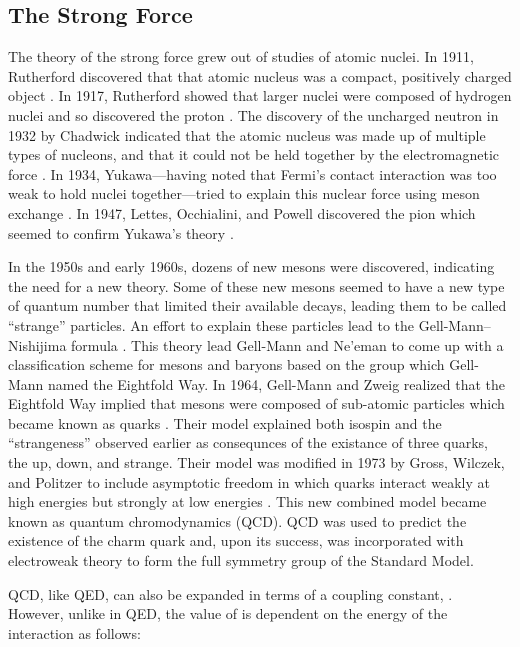 \subsection{The Strong Force}
\label{ssec:strong_force}

The theory of the strong force grew out of studies of atomic nuclei. In 1911,
Rutherford discovered that that atomic nucleus was a compact, positively
charged object \cite{rutherford1911}. In 1917, Rutherford showed that larger
nuclei were composed of hydrogen nuclei and so discovered the proton
\cite{rutherford1919}. The discovery of the uncharged neutron in 1932 by
Chadwick indicated that the atomic nucleus was made up of multiple types of
nucleons, and that it could not be held together by the electromagnetic force
\cite{chadwick1932}. In 1934, Yukawa---having noted that Fermi's contact
interaction was too weak to hold nuclei together---tried to explain this
nuclear force using meson exchange \cite{yukawa1935}. In 1947, Lettes,
Occhialini, and Powell discovered the pion which seemed to confirm Yukawa's
theory \cite{lattes1947}.

In the 1950s and early 1960s, dozens of new mesons were discovered, indicating
the need for a new theory. Some of these new mesons seemed to have a new type
of quantum number that limited their available decays, leading them to be
called ``strange'' particles. An effort to explain these particles lead to the
Gell-Mann--Nishijima formula
\cite{nakano1953}\cite{nishijima1955}\cite{gellmann1956}. This theory lead
Gell-Mann and Ne'eman to come up with a classification scheme for mesons and
baryons based on the \SUthree group which Gell-Mann named the Eightfold Way. In
1964, Gell-Mann and Zweig realized that the Eightfold Way implied that mesons
were composed of sub-atomic particles which became known as quarks
\cite{gellmann1964}\cite{zweig1964}. Their model explained both isospin and the
``strangeness'' observed earlier as consequnces of the existance of three
quarks, the up, down, and strange. Their model was modified in 1973 by Gross,
Wilczek, and Politzer to include asymptotic freedom in which quarks interact
weakly at high energies but strongly at low energies
\cite{gross_1973}\cite{politzer_1973}. This new combined model became known as
quantum chromodynamics (QCD). QCD was used to predict the existence of the
charm quark and, upon its success, was incorporated with electroweak theory to
form the full \SUthreeSUtwoUone symmetry group of the Standard Model.

QCD, like QED, can also be expanded in terms of a coupling constant,
\alphastrong. However, unlike \fsc in QED, the value of \alphastrong is
dependent on the energy of the interaction as follows:

